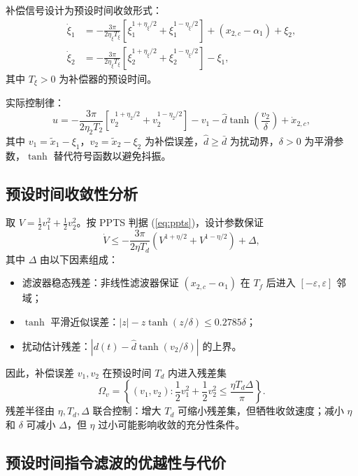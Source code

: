 \documentclass[UTF8,a4paper,11pt]{ctexart}
\begin{document}
补偿信号设计为预设时间收敛形式：
\begin{align}
\dot{\xi}_1 &= -\frac{3\pi}{2\eta_{\xi} T_{\xi}}
\left[ \xi_1^{1+\eta_{\xi}/2} + \xi_1^{1-\eta_{\xi}/2} \right]
+ (x_{2,c} - \alpha_1) + \xi_2, \\
\dot{\xi}_2 &= -\frac{3\pi}{2\eta_{\xi} T_{\xi}}
\left[ \xi_2^{1+\eta_{\xi}/2} + \xi_2^{1-\eta_{\xi}/2} \right]
- \xi_1,
\end{align}
其中 $T_{\xi} > 0$ 为补偿器的预设时间。

实际控制律：
\begin{equation}
u = -\frac{3\pi}{2\eta_2 T_2}
\left[ v_2^{1+\eta_2/2} + v_2^{1-\eta_2/2} \right]
- v_1 - \hat{d}\tanh\left(\frac{v_2}{\delta}\right) + \dot{x}_{2,c},
\end{equation}
其中 $v_1 = \tilde{x}_1 - \xi_1$，$v_2 = \tilde{x}_2 - \xi_2$ 为补偿误差，$\hat{d} \geq \bar{d}$ 为扰动界，$\delta > 0$ 为平滑参数，$\tanh$ 替代符号函数以避免抖振。

\subsection{预设时间收敛性分析}

取 $V = \frac12 v_1^2 + \frac12 v_2^2$。按 PPTS 判据 (\ref{eq:ppts})，设计参数保证
\begin{equation}
\dot{V} \leq -\frac{3\pi}{2\eta T_d}\left(V^{1+\eta/2} + V^{1-\eta/2}\right) + \Delta,
\end{equation}
其中 $\Delta$ 由以下因素组成：
\begin{itemize}
  \item 滤波器稳态残差：非线性滤波器保证 $(x_{2,c} - \alpha_1)$ 在 $T_f$ 后进入 $[-\varepsilon,\varepsilon]$ 邻域；
  \item $\tanh$ 平滑近似误差：$|z| - z\tanh(z/\delta) \leq 0.2785\delta$；
  \item 扰动估计残差：$|d(t) - \hat{d}\tanh(v_2/\delta)|$ 的上界。
\end{itemize}
因此，补偿误差 $v_1, v_2$ 在预设时间 $T_d$ 内进入残差集
\begin{equation}
\Omega_v = \left\{ (v_1,v_2) : \frac12 v_1^2 + \frac12 v_2^2 \leq \frac{\eta T_d \Delta}{\pi} \right\}.
\end{equation}
残差半径由 $\eta, T_d, \Delta$ 联合控制：增大 $T_d$ 可缩小残差集，但牺牲收敛速度；减小 $\eta$ 和 $\delta$ 可减小 $\Delta$，但 $\eta$ 过小可能影响收敛的充分性条件。

\subsection{预设时间指令滤波的优越性与代价}
\end{document}
